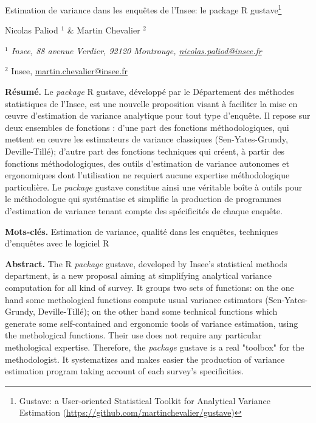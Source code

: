 \documentclass[12pt]{article}
\begin{document}

\begin{center}
{\Large
	{\sc  Estimation de variance dans les enquêtes de l'Insee:
le package R gustave\footnote{Gustave: a User-oriented Statistical Toolkit for Analytical Variance Estimation (\url{https://github.com/martinchevalier/gustave})}}
}
\bigskip

 Nicolas Paliod $^{1}$ \& Martin Chevalier $^{2}$
\bigskip

{\it
$^{1}$ Insee, 88 avenue Verdier, 92120 Montrouge, \href{mailto:nicolas.paliod@insee.fr}{nicolas.paliod@insee.fr}

$^{2}$ Insee, \href{mailto:martin.chevalier@insee.fr}{martin.chevalier@insee.fr}
}
\end{center}
\bigskip


{\bf Résumé.} Le \textit{package} R gustave, développé par le Département des méthodes statistiques de l'Insee, est une nouvelle proposition visant à faciliter la mise en \oe uvre d'estimation de variance analytique pour tout type d'enquête. Il repose sur deux ensembles de fonctions : d'une part des fonctions méthodologiques, qui mettent en \oe uvre les estimateurs de variance classiques (Sen-Yates-Grundy, Deville-Tillé); d'autre part des fonctions techniques qui créent, à partir des fonctions méthodologiques, des outils d'estimation de variance autonomes et ergonomiques dont l'utilisation ne requiert aucune expertise méthodologique particulière. Le \textit{package} gustave constitue ainsi une véritable \og boîte à outils \fg{} pour le méthodologue qui systématise et simplifie la production de programmes d'estimation de variance tenant compte des spécificités de chaque enquête.

{\bf Mots-clés.} Estimation de variance, qualité dans les enquêtes, techniques d’enquêtes avec le logiciel R

\bigskip

{\bf Abstract.} The R \textit{package} gustave, developed by Insee's statistical methods department, is a new proposal aiming at simplifying analytical variance computation for all kind of survey. It groups two sets of functions: on the one hand some methological functions compute usual variance estimators (Sen-Yates-Grundy, Deville-Tillé); on the other hand some technical functions which generate some self-contained and ergonomic tools of variance estimation, using the methological functions. Their use does not require any particular methological expertise. Therefore, the \textit{package} gustave is a real "toolbox" for the methodologist. It systematizes and makes easier the production of variance estimation program taking account of each survey's specificities.
\end{document}
